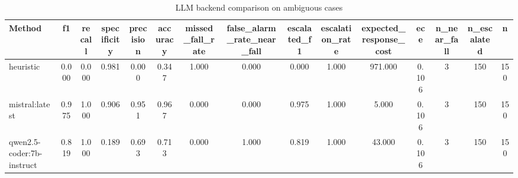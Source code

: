 \begin{table}[t]
\centering
\caption{LLM backend comparison on ambiguous cases}
\begin{tabular}{lcccccccccccccc}
\toprule
Method & f1 & recall & specificity & precision & accuracy & missed_fall_rate & false_alarm_rate_near_fall & escalated_f1 & escalation_rate & expected_response_cost & ece & n_near_fall & n_escalated & n \\
\midrule
heuristic & 0.000 & 0.000 & 0.981 & 0.000 & 0.347 & 1.000 & 0.000 & 0.000 & 1.000 & 971.000 & 0.106 & 3 & 150 & 150 \\
mistral:latest & 0.975 & 1.000 & 0.906 & 0.951 & 0.967 & 0.000 & 0.000 & 0.975 & 1.000 & 5.000 & 0.106 & 3 & 150 & 150 \\
qwen2.5-coder:7b-instruct & 0.819 & 1.000 & 0.189 & 0.693 & 0.713 & 0.000 & 1.000 & 0.819 & 1.000 & 43.000 & 0.106 & 3 & 150 & 150 \\
\bottomrule
\end{tabular}
\end{table}